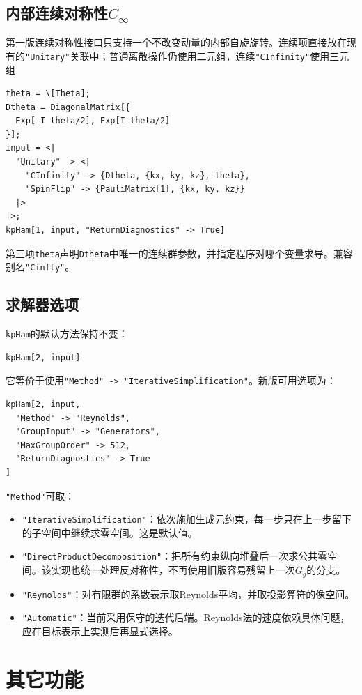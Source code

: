 \documentclass[titlepage,a4paper,12pt,AutoFakeBold]{article}
\begin{document}
\subsection{内部连续对称性\texorpdfstring{$C_\infty$}{C-infinity}}

第一版连续对称性接口只支持一个不改变动量的内部自旋旋转。连续项直接放在现有的\lstinline|"Unitary"|关联中；普通离散操作仍使用二元组，连续\lstinline|"CInfinity"|使用三元组
\begin{lstlisting}[numbers=none]
theta = \[Theta];
Dtheta = DiagonalMatrix[{
  Exp[-I theta/2], Exp[I theta/2]
}];
input = <|
  "Unitary" -> <|
    "CInfinity" -> {Dtheta, {kx, ky, kz}, theta},
    "SpinFlip" -> {PauliMatrix[1], {kx, ky, kz}}
  |>
|>;
kpHam[1, input, "ReturnDiagnostics" -> True]
\end{lstlisting}
第三项\lstinline|theta|声明\lstinline|Dtheta|中唯一的连续群参数，并指定程序对哪个变量求导。兼容别名\lstinline|"Cinfty"|。
\subsection{求解器选项}

\lstinline|kpHam|的默认方法保持不变：
\begin{lstlisting}[numbers=none]
kpHam[2, input]
\end{lstlisting}
它等价于使用\lstinline|"Method" -> "IterativeSimplification"|。新版可用选项为：
\begin{lstlisting}[numbers=none]
kpHam[2, input,
  "Method" -> "Reynolds",
  "GroupInput" -> "Generators",
  "MaxGroupOrder" -> 512,
  "ReturnDiagnostics" -> True
]
\end{lstlisting}
\lstinline|"Method"|可取：
\begin{itemize}
\item \lstinline|"IterativeSimplification"|：依次施加生成元约束，每一步只在上一步留下的子空间中继续求零空间。这是默认值。
\item \lstinline|"DirectProductDecomposition"|：把所有约束纵向堆叠后一次求公共零空间。该实现也统一处理反对称性，不再使用旧版容易残留上一次$G_g$的分支。
\item \lstinline|"Reynolds"|：对有限群的系数表示取Reynolds平均，并取投影算符的像空间。
\item \lstinline|"Automatic"|：当前采用保守的迭代后端。Reynolds法的速度依赖具体问题，应在目标表示上实测后再显式选择。
\end{itemize}




\section{其它功能}
\end{document}

